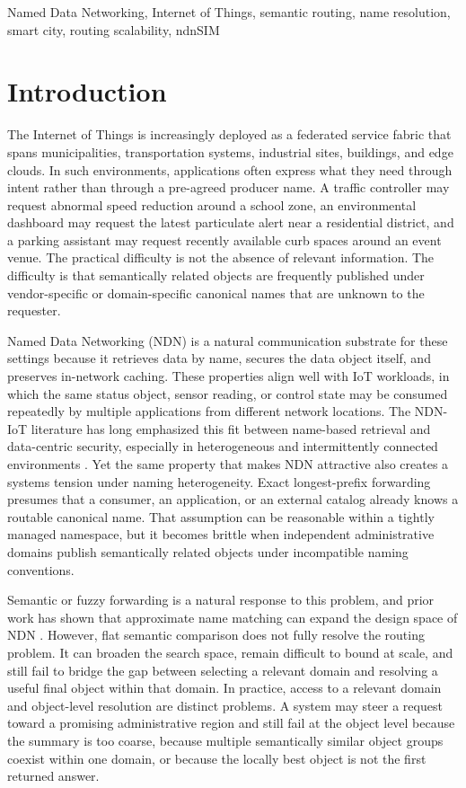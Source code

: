 \documentclass[journal]{IEEEtran}
\begin{document}
\begin{IEEEkeywords}
Named Data Networking, Internet of Things, semantic routing, name resolution, smart city, routing scalability, ndnSIM
\end{IEEEkeywords}

\section{Introduction}

The Internet of Things is increasingly deployed as a federated service fabric that spans municipalities, transportation systems, industrial sites, buildings, and edge clouds. In such environments, applications often express what they need through intent rather than through a pre-agreed producer name. A traffic controller may request abnormal speed reduction around a school zone, an environmental dashboard may request the latest particulate alert near a residential district, and a parking assistant may request recently available curb spaces around an event venue. The practical difficulty is not the absence of relevant information. The difficulty is that semantically related objects are frequently published under vendor-specific or domain-specific canonical names that are unknown to the requester.

Named Data Networking (NDN) is a natural communication substrate for these settings because it retrieves data by name, secures the data object itself, and preserves in-network caching. These properties align well with IoT workloads, in which the same status object, sensor reading, or control state may be consumed repeatedly by multiple applications from different network locations. The NDN-IoT literature has long emphasized this fit between name-based retrieval and data-centric security, especially in heterogeneous and intermittently connected environments \cite{ndn_iot_invited,inf_ndn,sanr}. Yet the same property that makes NDN attractive also creates a systems tension under naming heterogeneity. Exact longest-prefix forwarding presumes that a consumer, an application, or an external catalog already knows a routable canonical name. That assumption can be reasonable within a tightly managed namespace, but it becomes brittle when independent administrative domains publish semantically related objects under incompatible naming conventions.

Semantic or fuzzy forwarding is a natural response to this problem, and prior work has shown that approximate name matching can expand the design space of NDN \cite{fuzzy,semantic_distribution}. However, flat semantic comparison does not fully resolve the routing problem. It can broaden the search space, remain difficult to bound at scale, and still fail to bridge the gap between selecting a relevant domain and resolving a useful final object within that domain. In practice, access to a relevant domain and object-level resolution are distinct problems. A system may steer a request toward a promising administrative region and still fail at the object level because the summary is too coarse, because multiple semantically similar object groups coexist within one domain, or because the locally best object is not the first returned answer.
\end{document}

